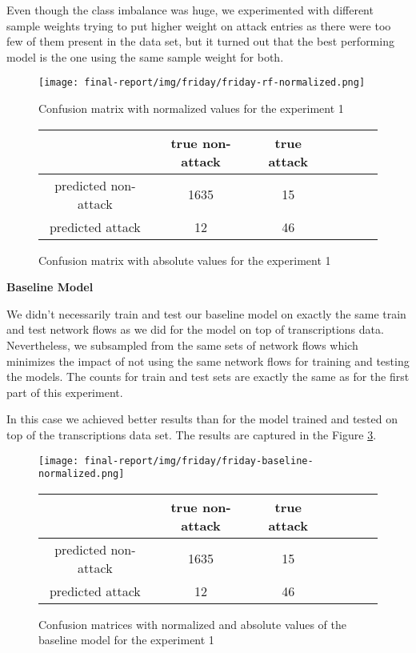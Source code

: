 \documentclass{article}
\begin{document}
Even though the class imbalance was huge, we experimented with different sample weights trying to put higher weight on attack entries as there were too few of them present in the data set, but it turned out that the best performing model is the one using the same sample weight for both.

\begin{figure}[h!]
    \centering
    \texttt{[image: final-report/img/friday/friday-rf-normalized.png]}
    \caption{Confusion matrix with normalized values for the experiment 1}
    \label{fig-friday-rf-normalized}
\end{figure}

\begin{figure}[h!]
\centering
\begin{tabular}{ |c|c|c|c|c|c|c| }
 \hline
  & true non-attack & true attack \\
 \hline
 predicted non-attack & 1635 & 15 \\
 \hline
 predicted attack & 12 & 46 \\
 \hline
\end{tabular}
\caption{Confusion matrix with absolute values for the experiment 1}
\label{tab-friday-rf-absolute}
\end{figure}


\vspace{0.5cm}
\noindent\textbf{Baseline Model}

\noindent We didn't necessarily train and test our baseline model on exactly the same train and test network flows as we did for the model on top of transcriptions data. Nevertheless, we subsampled from the same sets of network flows which minimizes the impact of not using the same network flows for training and testing the models. The counts for train and test sets are exactly the same as for the first part of this experiment.

In this case we achieved better results than for the model trained and tested on top of the transcriptions data set. The results are captured in the Figure \ref{fig-exp1-baseline}.

\begin{figure}[h!]
    \centering
    \texttt{[image: final-report/img/friday/friday-baseline-normalized.png]}

    \centering
    \begin{tabular}{ |c|c|c|c|c|c|c| }
     \hline
      & true non-attack & true attack \\
     \hline
     predicted non-attack & 1635 & 15 \\
     \hline
     predicted attack & 12 & 46 \\
     \hline
    \end{tabular}
    \caption{Confusion matrices with normalized and absolute values of the baseline model for the experiment 1}
    \label{fig-exp1-baseline}
\end{figure}
\end{document}
